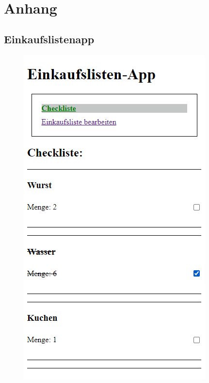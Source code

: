 

\chapter{Anhang}

\section*{Einkaufslistenapp}
\begin{figure}[h]
    \begin{minipage}[H]{.45\textwidth}
        \includegraphics[width=\textwidth]{img/vue-Einkaufsliste-Checkliste}

\end{minipage}
\end{figure}
